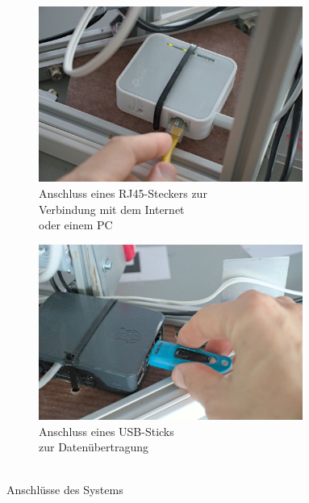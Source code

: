 \documentclass[./00PhotoBox.tex]{subfiles}
\begin{document}
\begin{figure}[htbp]
    \centering
    \begin{subfigure}{0.48\textwidth}
        \includegraphics[width=0.95\textwidth]{img/9_anleitung/rj45.jpg}
        \caption{Anschluss eines RJ45-Steckers zur\\Verbindung mit dem Internet\\oder einem PC}
        \label{img:rj45}
    \end{subfigure}
    \begin{subfigure}{0.48\textwidth}
        \includegraphics[width=0.95\textwidth]{img/9_anleitung/usbstick.jpg}
        \caption{Anschluss eines USB-Sticks\\ zur Datenübertragung\\~}
        \label{img:usbstick}
    \end{subfigure}
    \caption{Anschlüsse des Systems}
\end{figure}
\end{document}
